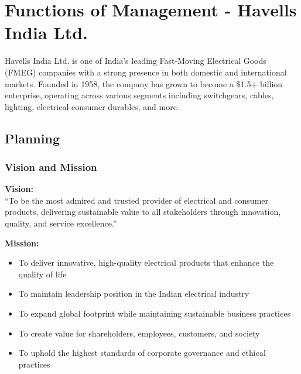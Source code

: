 \documentclass[12pt,a4paper]{article}
\begin{document}
\newpage
\tableofcontents
\newpage

\section{Functions of Management - Havells India Ltd.}

Havells India Ltd. is one of India's leading Fast-Moving Electrical Goods (FMEG) companies with a strong presence in both domestic and international markets. Founded in 1958, the company has grown to become a \$1.5+ billion enterprise, operating across various segments including switchgears, cables, lighting, electrical consumer durables, and more.

\subsection{Planning}

\subsubsection{Vision and Mission}

\textbf{Vision:}\\
``To be the most admired and trusted provider of electrical and consumer products, delivering sustainable value to all stakeholders through innovation, quality, and service excellence.''

\vspace{0.5cm}

\textbf{Mission:}
\begin{itemize}[leftmargin=*]
    \item To deliver innovative, high-quality electrical products that enhance the quality of life
    \item To maintain leadership position in the Indian electrical industry
    \item To expand global footprint while maintaining sustainable business practices
    \item To create value for shareholders, employees, customers, and society
    \item To uphold the highest standards of corporate governance and ethical practices
\end{itemize}
\end{document}
